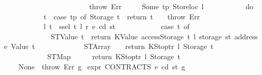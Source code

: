 \begin{isabellebody}
\ \ \ \ \ \ \ \ \ \ \ \ \ {\isacharbraceright}{\kern0pt}\isanewline
\ \ \ \ \ \ \ \ {\isacharbar}{\kern0pt}\ {\isacharunderscore}{\kern0pt}\ {\isasymRightarrow}\ throw\ Err{\isacharparenright}{\kern0pt}\isanewline
\ \ \ \ {\isacharbar}{\kern0pt}\ Some\ {\isacharparenleft}{\kern0pt}tp{\isacharcomma}{\kern0pt}\ {\isacharparenleft}{\kern0pt}Storeloc\ l{\isacharparenright}{\kern0pt}{\isacharparenright}{\kern0pt}\ {\isasymRightarrow}\isanewline
\ \ \ \ \ \ \ \ \ \ do\ {\isacharbraceleft}{\kern0pt}\isanewline
\ \ \ \ \ \ \ \ \ \ \ \ t\ {\isasymleftarrow}\ case\ tp\ of\ Storage\ t\ {\isasymRightarrow}\ return\ t\ {\isacharbar}{\kern0pt}\ {\isacharunderscore}{\kern0pt}\ {\isasymRightarrow}\ throw\ Err{\isacharsemicolon}{\kern0pt}\isanewline
\ \ \ \ \ \ \ \ \ \ \ \ {\isacharparenleft}{\kern0pt}l{\isacharprime}{\kern0pt}{\isacharcomma}{\kern0pt}\ t{\isacharprime}{\kern0pt}{\isacharparenright}{\kern0pt}\ {\isasymleftarrow}\ ssel\ t\ l\ r\ e\ cd\ st{\isacharsemicolon}{\kern0pt}\isanewline
\ \ \ \ \ \ \ \ \ \ \ \ {\isacharparenleft}{\kern0pt}case\ t{\isacharprime}{\kern0pt}\ of\isanewline
\ \ \ \ \ \ \ \ \ \ \ \ \ \ STValue\ t{\isacharprime}{\kern0pt}{\isacharprime}{\kern0pt}\ {\isasymRightarrow}\ return\ {\isacharparenleft}{\kern0pt}KValue\ {\isacharparenleft}{\kern0pt}accessStorage\ t{\isacharprime}{\kern0pt}{\isacharprime}{\kern0pt}\ l{\isacharprime}{\kern0pt}\ {\isacharparenleft}{\kern0pt}storage\ st\ {\isacharparenleft}{\kern0pt}address\ e{\isacharparenright}{\kern0pt}{\isacharparenright}{\kern0pt}{\isacharparenright}{\kern0pt}{\isacharcomma}{\kern0pt}\ Value\ t{\isacharprime}{\kern0pt}{\isacharprime}{\kern0pt}{\isacharparenright}{\kern0pt}\isanewline
\ \ \ \ \ \ \ \ \ \ \ \ {\isacharbar}{\kern0pt}\ STArray\ {\isacharunderscore}{\kern0pt}\ {\isacharunderscore}{\kern0pt}\ {\isasymRightarrow}\ return\ {\isacharparenleft}{\kern0pt}KStoptr\ l{\isacharprime}{\kern0pt}{\isacharcomma}{\kern0pt}\ Storage\ t{\isacharprime}{\kern0pt}{\isacharparenright}{\kern0pt}\isanewline
\ \ \ \ \ \ \ \ \ \ \ \ {\isacharbar}{\kern0pt}\ STMap\ {\isacharunderscore}{\kern0pt}\ {\isacharunderscore}{\kern0pt}\ \ \ {\isasymRightarrow}\ return\ {\isacharparenleft}{\kern0pt}KStoptr\ l{\isacharprime}{\kern0pt}{\isacharcomma}{\kern0pt}\ Storage\ t{\isacharprime}{\kern0pt}{\isacharparenright}{\kern0pt}{\isacharparenright}{\kern0pt}\isanewline
\ \ \ \ \ \ \ \ \ \ {\isacharbraceright}{\kern0pt}\isanewline
\ \ \ \ {\isacharbar}{\kern0pt}\ None\ {\isasymRightarrow}\ throw\ Err{\isacharparenright}{\kern0pt}\ g{\isachardoublequoteclose}\isanewline
{\isacharbar}{\kern0pt}\ {\isachardoublequoteopen}expr\ CONTRACTS\ e\ cd\ st\ g\ {\isacharequal}{\kern0pt}\isanewline

\end{isabellebody}
